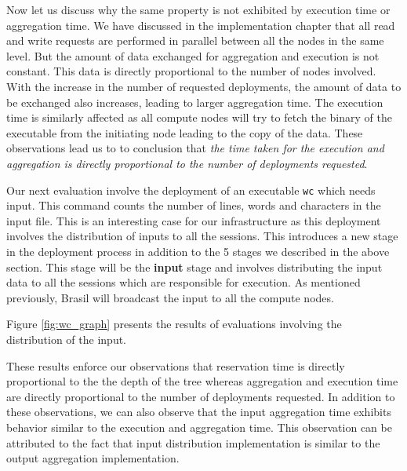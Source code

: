 Now let us discuss why the same property is not exhibited by execution time or
aggregation time. We have discussed in the implementation chapter that all
read and write requests are performed in parallel between all the nodes in the
same level.  But the amount of data exchanged for aggregation and execution is
not constant.  This data is directly proportional to the number of nodes
involved.  With the increase in the number of requested deployments, the
amount of data to be exchanged also increases, leading to larger aggregation
time. The execution time is similarly affected as all compute nodes will
try to fetch the binary of the executable from the initiating node leading to
the copy of the data. These observations lead us to to conclusion that
\textit{the time taken for the execution and aggregation is directly
proportional to the number of deployments requested}.

Our next evaluation involve the deployment of an executable \texttt{wc} which
needs input. This command counts the number of lines, words and characters in
the input file.  This is an interesting case for our infrastructure as this
deployment involves the distribution of inputs to all the sessions.  This
introduces a new stage in the deployment process in addition to the 5 stages we
described in the above section.  This stage will be the \textbf{input} stage and
involves distributing the input data to all the sessions which are responsible
for execution.  As mentioned previously,
Brasil will broadcast the input to all the compute
nodes.

Figure \ref{fig:wc_graph} presents the results of evaluations involving the
distribution of the input.


These results enforce our observations that reservation time is directly
proportional to the the depth of the tree whereas aggregation and execution time
are directly proportional to the number of deployments requested.  In addition
to these observations, we can also observe that the input aggregation time exhibits 
behavior similar to the execution and aggregation time.  This observation can be
attributed to the fact that input distribution implementation is similar
to the output aggregation implementation.  

